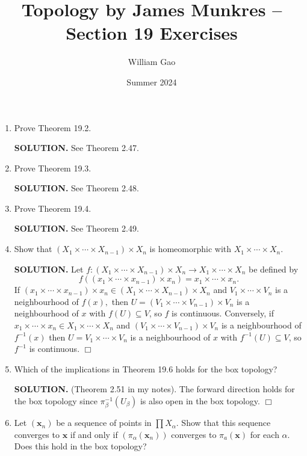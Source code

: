 \documentclass{article}
\title{Topology by James Munkres -- Section 19 Exercises}
\author{William Gao}
\date{Summer 2024}
\begin{document}
\maketitle

\begin{enumerate}
    \item Prove Theorem 19.2.

    {\bf SOLUTION.} See Theorem 2.47.
    
    \item Prove Theorem 19.3.

    {\bf SOLUTION.} See Theorem 2.48.
    
    \item Prove Theorem 19.4.

    {\bf SOLUTION.} See Theorem 2.49.

    \item Show that $(X_1 \times \cdots \times X_{n-1}) \times X_n$ is homeomorphic with $X_1 \times \cdots \times X_n$.

    {\bf SOLUTION.} Let $f:(X_1 \times \cdots \times X_{n-1}) \times X_n \rightarrow X_1 \times \cdots \times X_n$ be defined by
    $$f((x_1 \times \cdots \times x_{n-1}) \times x_n) = x_1 \times \cdots \times x_n.$$
    If $(x_1 \times \cdots \times x_{n-1}) \times x_n \in (X_1 \times \cdots \times X_{n-1}) \times X_n$ and $V_1 \times \cdots \times V_n$ is a neighbourhood of $f(x),$ then $U= (V_1 \times \cdots \times V_{n-1}) \times V_n$ is a neighbourhood of $x$ with $f(U) \subseteq V$, so $f$ is continuous. Conversely, if $x_1 \times \cdots \times x_n \in X_1 \times \cdots \times X_n$ and $(V_1 \times \cdots \times V_{n-1}) \times V_n$ is a neighbourhood of $f^{-1}(x)$ then $U = V_1 \times \cdots \times V_n$ is a neighbourhood of $x$ with $f^{-1}(U) \subseteq V$, so $f^{-1}$ is continuous. $\Box$

    \item Which of the implications in Theorem 19.6 holds for the box topology?

    {\bf SOLUTION.} (Theorem 2.51 in my notes). The forward direction holds for the box topology since $\pi_\beta^{-1}(U_\beta)$ is also open in the box topology. $\Box$

    \item Let $(\mathbf{x}_n)$ be a sequence of points in $\prod X_\alpha$. Show that this sequence converges to $\mathbf{x}$ if and only if $(\pi_\alpha(\mathbf{x}_n))$ converges to $\pi_a(\mathbf{x})$ for each $\alpha$. Does this hold in the box topology?


\end{enumerate}
\end{document}
